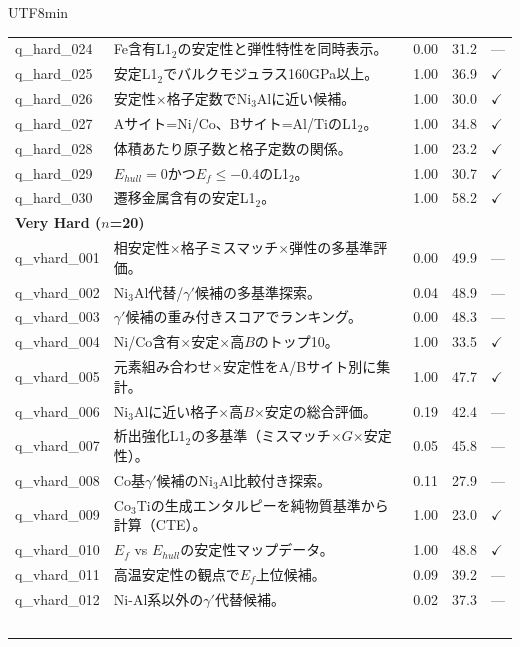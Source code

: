\documentclass[sn-mathphys,Numbered]{sn-jnl}
\begin{document}
\begin{CJK}{UTF8}{min}
\begin{longtable}{lp{8.5cm}ccl}
    q\_hard\_024 & Fe含有L1$_2$の安定性と弾性特性を同時表示。 & 0.00 & 31.2 & --- \\
    q\_hard\_025 & 安定L1$_2$でバルクモジュラス160GPa以上。 & 1.00 & 36.9 & $\checkmark$ \\
    q\_hard\_026 & 安定性$\times$格子定数でNi$_3$Alに近い候補。 & 1.00 & 30.0 & $\checkmark$ \\
    q\_hard\_027 & Aサイト=Ni/Co、Bサイト=Al/TiのL1$_2$。 & 1.00 & 34.8 & $\checkmark$ \\
    q\_hard\_028 & 体積あたり原子数と格子定数の関係。 & 1.00 & 23.2 & $\checkmark$ \\
    q\_hard\_029 & $E_{hull} = 0$かつ$E_f \leq -0.4$のL1$_2$。 & 1.00 & 30.7 & $\checkmark$ \\
    q\_hard\_030 & 遷移金属含有の安定L1$_2$。 & 1.00 & 58.2 & $\checkmark$ \\
    \midrule
    \multicolumn{5}{l}{\textbf{Very Hard ($n$=20)}} \\
    \midrule
    q\_vhard\_001 & 相安定性$\times$格子ミスマッチ$\times$弾性の多基準評価。 & 0.00 & 49.9 & --- \\
    q\_vhard\_002 & Ni$_3$Al代替/$\gamma'$候補の多基準探索。 & 0.04 & 48.9 & --- \\
    q\_vhard\_003 & $\gamma'$候補の重み付きスコアでランキング。 & 0.00 & 48.3 & --- \\
    q\_vhard\_004 & Ni/Co含有$\times$安定$\times$高$B$のトップ10。 & 1.00 & 33.5 & $\checkmark$ \\
    q\_vhard\_005 & 元素組み合わせ$\times$安定性をA/Bサイト別に集計。 & 1.00 & 47.7 & $\checkmark$ \\
    q\_vhard\_006 & Ni$_3$Alに近い格子$\times$高$B$$\times$安定の総合評価。 & 0.19 & 42.4 & --- \\
    q\_vhard\_007 & 析出強化L1$_2$の多基準（ミスマッチ$\times$$G$$\times$安定性）。 & 0.05 & 45.8 & --- \\
    q\_vhard\_008 & Co基$\gamma'$候補のNi$_3$Al比較付き探索。 & 0.11 & 27.9 & --- \\
    q\_vhard\_009 & Co$_3$Tiの生成エンタルピーを純物質基準から計算（CTE）。 & 1.00 & 23.0 & $\checkmark$ \\
    q\_vhard\_010 & $E_f$ vs $E_{hull}$の安定性マップデータ。 & 1.00 & 48.8 & $\checkmark$ \\
    q\_vhard\_011 & 高温安定性の観点で$E_f$上位候補。 & 0.09 & 39.2 & --- \\
    q\_vhard\_012 & Ni-Al系以外の$\gamma'$代替候補。 & 0.02 & 37.3 & --- \\
$$
\end{longtable}
\end{CJK}
\end{document}
